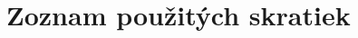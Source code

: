 \documentclass[12pt,twoside,a4paper]{book}   %
\begin{document}

% 
% 

\cleardoublepage

\cleardoublepage

\cleardoublepage

\cleardoublepage

\cleardoublepage

\cleardoublepage

\cleardoublepage



%
{
\def\CS{$\cal C\kern-0.1667em\lower.5ex\hbox{$\cal S$}\kern-0.075em $}

}

%

\cleardoublepage\chapter{Zoznam použitých skratiek}
\end{document}
